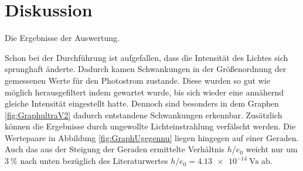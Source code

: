 
\section{Diskussion}
\label{sec:Diskussion}

 \begin{table}
  \centering
  \caption{Die Ergebnisse der Auswertung.}
  
 \end{table}

Schon bei der Durchführung ist aufgefallen, dass die Intensität des Lichtes sich
 sprunghaft änderte. Dadurch kamen Schwankungen in der Größenordnung der gemessenen
  Werte für den Photostrom zustande. Diese wurden so gut wie möglich herausgefiltert
   indem gewartet wurde, bis sich wieder eine annähernd gleiche Intensität eingestellt
   hatte. Dennoch sind besonders in dem Graphen \ref{fig:GraphultraV2} dadurch
   entstandene Schwankungen erkennbar. Zusätzlich können die Ergebnisse durch
   ungewollte Lichteinstrahlung verfälscht werden. Die Wertepaare in Abbildung
   \ref{fig:GraphUgegennu} liegen hingegen auf einer Geraden. Auch das aus
   der Steigung der Geraden ermittelte Verhältnis $h/e_0$ weicht nur um
   $\SI{3}{\percent}$ nach unten bezüglich des Literaturwertes
   $h/e_0=\SI{4.13e-14}{\volt\second}$ \cite{nistgov} ab.
